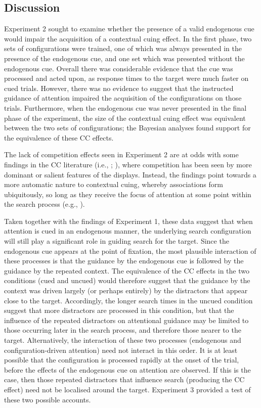 \documentclass[
  man,
  floatsintext,
  longtable,
  nolmodern,
  notxfonts,
  notimes,
  colorlinks=true,linkcolor=blue,citecolor=blue,urlcolor=blue]{apa7}
\begin{document}
\subsection{Discussion}\label{discussion-1}

Experiment 2 sought to examine whether the presence of a valid
endogenous cue would impair the acquisition of a contextual cuing
effect. In the first phase, two sets of configurations were trained, one
of which was always presented in the presence of the endogenous cue, and
one set which was presented without the endogenous cue. Overall there
was considerable evidence that the cue was processed and acted upon, as
response times to the target were much faster on cued trials. However,
there was no evidence to suggest that the instructed guidance of
attention impaired the acquisition of the configurations on those
trials. Furthermore, when the endogenous cue was never presented in the
final phase of the experiment, the size of the contextual cuing effect
was equivalent between the two sets of configurations; the Bayesian
analyses found support for the equivalence of these CC effects.

The lack of competition effects seen in Experiment 2 are at odds with
some findings in the CC literature (i.e., ; ), where
competition has been seen by more dominant or salient features of the
displays. Instead, the findings point towards a more automatic nature to
contextual cuing, whereby associations form ubiquitously, so long as
they receive the focus of attention at some point within the search
process (e.g., ).

Taken together with the findings of Experiment 1, these data suggest
that when attention is cued in an endogenous manner, the underlying
search configuration will still play a significant role in guiding
search for the target. Since the endogenous cue appears at the point of
fixation, the most plausible interaction of these processes is that the
guidance by the endogenous cue is followed by the guidance by the
repeated context. The equivalence of the CC effects in the two
conditions (cued and uncued) would therefore suggest that the guidance
by the context was driven largely (or perhaps entirely) by the
distractors that appear close to the target. Accordingly, the longer
search times in the uncued condition suggest that more distractors are
processed in this condition, but that the influence of the repeated
distractors on attentional guidance may be limited to those occurring
later in the search process, and therefore those nearer to the target.
Alternatively, the interaction of these two processes (endogenous and
configuration-driven attention) need not interact in this order. It is
at least possible that the configuration is processed rapidly at the
onset of the trial, before the effects of the endogenous cue on
attention are observed. If this is the case, then those repeated
distractors that influence search (producing the CC effect) need not be
localised around the target. Experiment 3 provided a test of these two
possible accounts.
\end{document}
